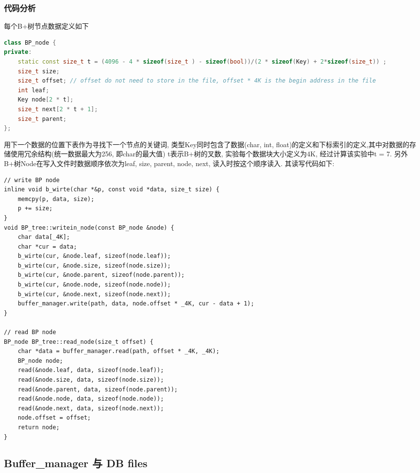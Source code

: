 \documentclass[10pt]{article}
\begin{document}
\begin{CJK}{UTF8}{gkai}
		\subsubsection{代码分析}
每个B+树节点数据定义如下
\begin{lstlisting}[language=c++]
class BP_node {
private:
    static const size_t t = (4096 - 4 * sizeof(size_t ) - sizeof(bool))/(2 * sizeof(Key) + 2*sizeof(size_t)) ;
    size_t size;
    size_t offset; // offset do not need to store in the file, offset * 4K is the begin address in the file
    int leaf;
    Key node[2 * t];
    size_t next[2 * t + 1];
    size_t parent;
};
\end{lstlisting}
用下一个数据的位置下表作为寻找下一个节点的关键词, 类型Key同时包含了数据(char, int, float)的定义和下标索引的定义,其中对数据的存储使用冗余结构(统一数据最大为256, 即char的最大值)  t表示B+树的叉数, 实验每个数据块大小定义为4K, 经过计算该实验中t = 7.
另外B+树Node在写入文件时数据顺序依次为leaf, size, parent, node, next, 读入时按这个顺序读入.
其读写代码如下:
\begin{lstlisting}
// write BP node
inline void b_wirte(char *&p, const void *data, size_t size) {
    memcpy(p, data, size);
    p += size;
}
void BP_tree::writein_node(const BP_node &node) {
    char data[_4K];
    char *cur = data;
    b_wirte(cur, &node.leaf, sizeof(node.leaf));
    b_wirte(cur, &node.size, sizeof(node.size));
    b_wirte(cur, &node.parent, sizeof(node.parent));
    b_wirte(cur, &node.node, sizeof(node.node));
    b_wirte(cur, &node.next, sizeof(node.next));
    buffer_manager.write(path, data, node.offset * _4K, cur - data + 1);
}

// read BP node
BP_node BP_tree::read_node(size_t offset) {
    char *data = buffer_manager.read(path, offset * _4K, _4K);
    BP_node node;
    read(&node.leaf, data, sizeof(node.leaf));
    read(&node.size, data, sizeof(node.size));
    read(&node.parent, data, sizeof(node.parent));
    read(&node.node, data, sizeof(node.node));
    read(&node.next, data, sizeof(node.next));
    node.offset = offset;
    return node;
}
\end{lstlisting}
	
	\subsection{Buffer\_manager 与 DB files}

\end{CJK}
\end{document}
